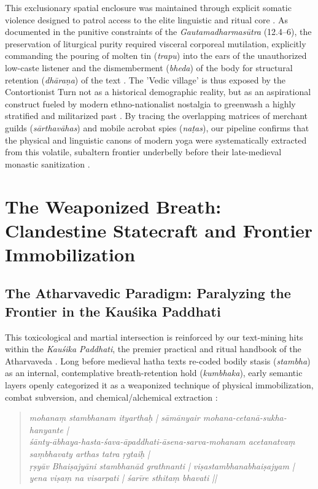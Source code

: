 \documentclass[11pt,twoside,letterpaper]{article}
\begin{document}
This exclusionary spatial enclosure was maintained through explicit somatic violence designed to patrol access to the elite linguistic and ritual core \citep{McCartney2026}. As documented in the punitive constraints of the \textit{Gautamadharmasūtra} (12.4–6), the preservation of liturgical purity required visceral corporeal mutilation, explicitly commanding the pouring of molten tin (\textit{trapu}) into the ears of the unauthorized low-caste listener and the dismemberment (\textit{bheda}) of the body for structural retention (\textit{dhāraṇa}) of the text \citep{McCartney2026}. The 'Vedic village' is thus exposed by the Contortionist Turn not as a historical demographic reality, but as an aspirational construct fueled by modern ethno-nationalist nostalgia to greenwash a highly stratified and militarized past \citep{McCartney2026}. By tracing the overlapping matrices of merchant guilds (\textit{sārthavāhas}) and mobile acrobat spies (\textit{naṭas}), our pipeline confirms that the physical and linguistic canons of modern yoga were systematically extracted from this volatile, subaltern frontier underbelly before their late-medieval monastic sanitization \citep{McCartney2026}.

\section{The Weaponized Breath: Clandestine Statecraft and Frontier Immobilization}

\subsection{The Atharvavedic Paradigm: Paralyzing the Frontier in the Kauśika Paddhati}
This toxicological and martial intersection is reinforced by our text-mining hits within the \textit{Kauśika Paddhati}, the premier practical and ritual handbook of the Atharvaveda \citep{KauśP}. Long before medieval hatha texts re-coded bodily stasis (\textit{stambha}) as an internal, contemplative breath-retention hold (\textit{kumbhaka}), early semantic layers openly categorized it as a weaponized technique of physical immobilization, combat subversion, and chemical/alchemical extraction \citep{Birch2024, KauśP}:

\begin{quote}
\small
\textit{mohanaṃ stambhanam ityarthaḥ | sāmānyair mohana-cetanā-sukha-hanyante | \\
śānty-ābhaya-hasta-śava-āpaddhati-āsena-sarva-mohanam acetanatvaṃ saṃbhavaty arthas tatra ṛgtaiḥ | \\
ṛṣyāv Bhaiṣajyāni stambhanād grathnanti | viṣastambhanabhaiṣajyam | \\
yena viṣaṃ na visarpati | śarīre sthitaṃ bhavati ||}
\end{quote}
\end{document}
